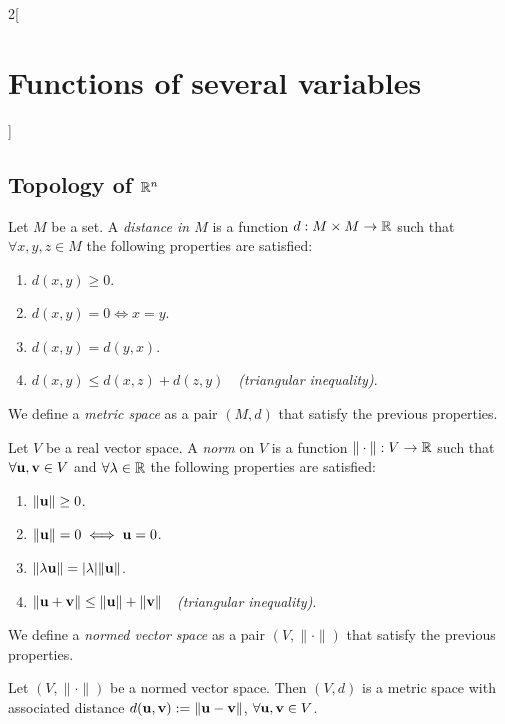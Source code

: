 \documentclass[../../../main.tex]{subfiles}
\begin{document}
\begin{multicols}{2}[\section{Functions of several variables}]
    \subsection{Topology of \texorpdfstring{$\mathbb{R}^n$}{Rn}}
    \begin{definition}
        Let $M$ be a set. A \textit{distance in $M$} is a function $d:M\times M\rightarrow\mathbb{R} $ such that $\forall x,y,z\in M$ the following properties are satisfied:
        \begin{enumerate}
            \item $d(x,y)\geq 0$.
            \item $d(x,y)=0\iff x=y$.
            \item $d(x,y)=d(y,x)$.
            \item $d(x,y)\leq d(x,z)+d(z,y)\quad$\textit{(triangular inequality)}.
        \end{enumerate}
        We define a \textit{metric space} as a pair $(M,d)$ that satisfy the previous properties.
        \label{FOSV_metric}
    \end{definition}
    \begin{definition}\label{FOSV_norm}
        Let $V$ be a real vector space. A \textit{norm} on $V$ is a function $\|\cdot\|:V\rightarrow\mathbb{R} $ such that $\forall \boldsymbol{\mathrm{u}},\boldsymbol{\mathrm{v}}\in V$ and $\forall\lambda\in\mathbb{R} $ the following properties are satisfied:
        \begin{enumerate}
            \item $\|\boldsymbol{\mathrm{u}}\|\geq 0$.
            \item $\|\boldsymbol{\mathrm{u}}\|=0\iff \boldsymbol{\mathrm{u}}=0$.
            \item $\|\lambda \boldsymbol{\mathrm{u}}\|=|\lambda|\|\boldsymbol{\mathrm{u}}\|$.
            \item $\|\boldsymbol{\mathrm{u}}+\boldsymbol{\mathrm{v}}\|\leq \|\boldsymbol{\mathrm{u}}\|+\|\boldsymbol{\mathrm{v}}\|\quad$\textit{(triangular inequality)}.
        \end{enumerate}
        We define a \textit{normed vector space} as a pair $(V,\|\cdot\|)$ that satisfy the previous properties.
    \end{definition}
    \begin{prop}
        Let $(V,\|\cdot\|)$ be a normed vector space. Then $(V,d)$ is a metric space with associated distance $d(\boldsymbol{\mathrm{u}},\boldsymbol{\mathrm{v}}):=\|\boldsymbol{\mathrm{u}}-\boldsymbol{\mathrm{v}}\|$, $\forall \boldsymbol{\mathrm{u}},\boldsymbol{\mathrm{v}}\in V$.

\end{prop}
\end{multicols}
\end{document}
